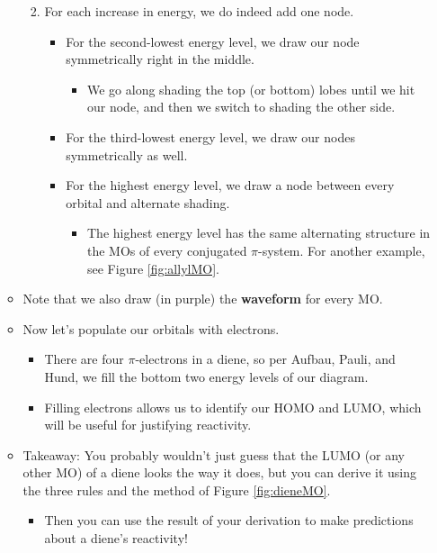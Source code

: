 \documentclass[../notes.tex]{subfiles}
\begin{document}
\begin{itemize}
\begin{itemize}
\begin{enumerate}
\begin{itemize}
            \end{itemize}
            \item For each increase in energy, we do indeed add one node.
            \begin{itemize}
                \item For the second-lowest energy level, we draw our node symmetrically right in the middle.
                \begin{itemize}
                    \item We go along shading the top (or bottom) lobes until we hit our node, and then we switch to shading the other side.
                \end{itemize}
                \item For the third-lowest energy level, we draw our nodes symmetrically as well.
                \item For the highest energy level, we draw a node between every orbital and alternate shading.
                \begin{itemize}
                    \item The highest energy level has the same alternating structure in the MOs of every conjugated $\pi$-system. For another example, see Figure \ref{fig:allylMO}.
                \end{itemize}
            \end{itemize}
        \end{enumerate}
        \item Note that we also draw (in purple) the \textbf{waveform} for every MO.
        \item Now let's populate our orbitals with electrons.
        \begin{itemize}
            \item There are four $\pi$-electrons in a diene, so per Aufbau, Pauli, and Hund, we fill the bottom two energy levels of our diagram.
            \item Filling electrons allows us to identify our HOMO and LUMO, which will be useful for justifying reactivity.
        \end{itemize}
        \item Takeaway: You probably wouldn't just guess that the LUMO (or any other MO) of a diene looks the way it does, but you can derive it using the three rules and the method of Figure \ref{fig:dieneMO}.
        \begin{itemize}
            \item Then you can use the result of your derivation to make predictions about a diene's reactivity!

\end{itemize}
\end{itemize}
\end{itemize}
\end{document}
